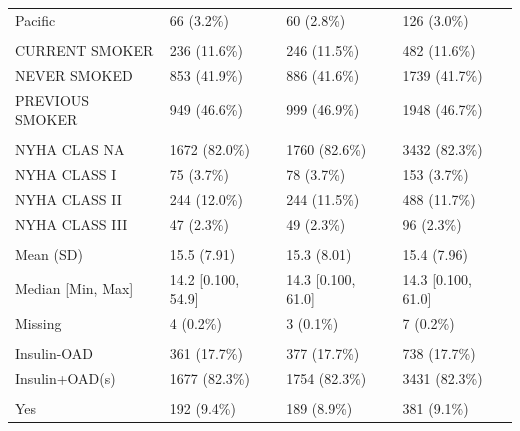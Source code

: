\documentclass[
]{article}
\begin{document}
\begin{longtable}[t]{llll}
\hspace{1em}Pacific & 66 (3.2\%) & 60 (2.8\%) & 126 (3.0\%)\\
\addlinespace[0.3em]
\multicolumn{4}{l}{\textbf{SMOKER}}\\
\hspace{1em}CURRENT SMOKER & 236 (11.6\%) & 246 (11.5\%) & 482 (11.6\%)\\
\hspace{1em}NEVER SMOKED & 853 (41.9\%) & 886 (41.6\%) & 1739 (41.7\%)\\
\hspace{1em}PREVIOUS SMOKER & 949 (46.6\%) & 999 (46.9\%) & 1948 (46.7\%)\\
\addlinespace[0.3em]
\multicolumn{4}{l}{\textbf{NYHACLAS}}\\
\hspace{1em}NYHA CLAS NA & 1672 (82.0\%) & 1760 (82.6\%) & 3432 (82.3\%)\\
\hspace{1em}NYHA CLASS I & 75 (3.7\%) & 78 (3.7\%) & 153 (3.7\%)\\
\hspace{1em}NYHA CLASS II & 244 (12.0\%) & 244 (11.5\%) & 488 (11.7\%)\\
\hspace{1em}NYHA CLASS III & 47 (2.3\%) & 49 (2.3\%) & 96 (2.3\%)\\
\addlinespace[0.3em]
\multicolumn{4}{l}{\textbf{DIABDUR}}\\
\hspace{1em}Mean (SD) & 15.5 (7.91) & 15.3 (8.01) & 15.4 (7.96)\\
\hspace{1em}Median [Min, Max] & 14.2 [0.100, 54.9] & 14.3 [0.100, 61.0] & 14.3 [0.100, 61.0]\\
\hspace{1em}Missing & 4 (0.2\%) & 3 (0.1\%) & 7 \vphantom{1} (0.2\%)\\
\addlinespace[0.3em]
\multicolumn{4}{l}{\textbf{ANTDBFL}}\\
\hspace{1em}Insulin-OAD & 361 (17.7\%) & 377 (17.7\%) & 738 (17.7\%)\\
\hspace{1em}Insulin+OAD(s) & 1677 (82.3\%) & 1754 (82.3\%) & 3431 (82.3\%)\\
\addlinespace[0.3em]
\multicolumn{4}{l}{\textbf{AHYPERFL}}\\
\hspace{1em}Yes & 192 (9.4\%) & 189 (8.9\%) & 381 (9.1\%)\\

\end{longtable}
\end{document}
